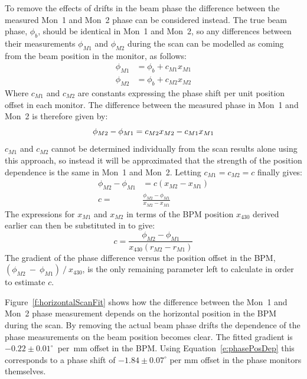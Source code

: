 To remove the effects of drifts in the beam phase the difference between the measured Mon~1 and Mon~2 phase can be considered instead. The true beam phase, \(\phi_b\), should be identical in Mon~1 and Mon~2, so any differences between their measurements \(\phi_{M1}\) and \(\phi_{M2}\) during the scan can be modelled as coming from the beam position in the monitor, as follows:
\begin{align}
\phi_{M1} &= \phi_b + c_{M1}x_{M1} \\
\phi_{M2} &= \phi_b + c_{M2}x_{M2}
\end{align}
Where \(c_{M1}\) and \(c_{M2}\) are constants expressing the phase shift per unit position offset in each monitor. The difference between the measured phase in Mon~1 and Mon~2 is therefore given by:
\begin{equation}
\phi_{M2}-\phi_{M1} = c_{M2}x_{M2} - c_{M1}x_{M1} \\
\end{equation}
\(c_{M1}\) and \(c_{M2}\) cannot be determined individually from the scan results alone using this approach, so instead it will be approximated that the strength of the position dependence is the same in Mon~1 and Mon~2. Letting \(c_{M1} = c_{M2} = c\) finally gives:
\begin{align}
\phi_{M2}-\phi_{M1} &= c(x_{M2}-x_{M1}) \\
c = &\frac{\phi_{M2}-\phi_{M1}}{x_{M2}-x_{M1}} 
\end{align}
The expressions for \(x_{M1}\) and \(x_{M2}\) in terms of the BPM position \(x_{430}\) derived earlier can then be substituted in to give:
\begin{equation}
c = \frac{\phi_{M2}-\phi_{M1}}{x_{430}(r_{M2}-r_{M1})}
\label{e:phasePosDep}
\end{equation}
The gradient of the phase difference versus the position offset in the BPM, \((\phi_{M2}~-~\phi_{M1})~/~x_{430}\), is the only remaining parameter left to calculate in order to estimate \(c\).

Figure~\ref{f:horizontalScanFit} shows how the difference between the Mon~1 and Mon~2 phase measurement depends on the horizontal position in the BPM during the scan. By removing the actual beam phase drifts the dependence of the phase measurements on the beam position becomes clear. The fitted gradient is \(-0.22\pm0.01^\circ\)~per~mm offset in the BPM. Using Equation~\ref{e:phasePosDep} this corresponds to a phase shift of \(-1.84\pm0.07^\circ\) per mm offset in the phase monitors themselves.

